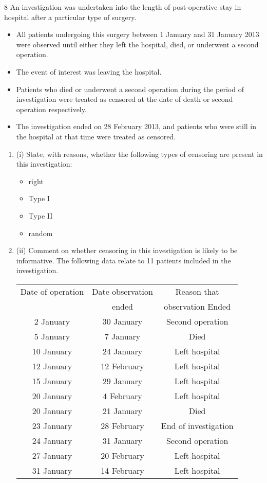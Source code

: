 \documentclass[a4paper,12pt]{article}
\begin{document}
8 An investigation was undertaken into the length of post-operative stay in hospital after
a particular type of surgery. 
\begin{itemize}
    \item All patients undergoing this surgery between 1 January
and 31 January 2013 were observed until either they left the hospital, died, or
underwent a second operation. 
\item The event of interest was leaving the hospital.
\item Patients who died or underwent a second operation during the period of investigation
were treated as censored at the date of death or second operation respectively. 
\item The
investigation ended on 28 February 2013, and patients who were still in the hospital at
that time were treated as censored.
\end{itemize}

\begin{enumerate}
    \item 

(i) State, with reasons, whether the following types of censoring are present in
this investigation:
\begin{itemize}
\item right
\item Type I
\item Type II
\item random
\end{itemize}


\item (ii) Comment on whether censoring in this investigation is likely to be
informative. 
The following data relate to 11 patients included in the investigation.

\begin{center}
\begin{tabular}{c|c|c} \hline
Date of operation & Date observation &  Reason that \\
& ended & observation Ended \\ \hline \hline
2 January &  30 January &  Second operation \\ \hline
5 January &  7 January &  Died \\ \hline
10 January &  24 January &  Left hospital \\ \hline
12 January &  12 February &  Left hospital \\ \hline
15 January &  29 January &  Left hospital \\ \hline
20 January &  4 February &  Left hospital \\ \hline
20 January &  21 January &  Died \\ \hline
23 January &  28 February &  End of investigation  \\ \hline
24 January &  31 January &  Second operation \\ \hline
27 January &  20 February &  Left hospital \\ \hline
31 January &  14 February &  Left hospital \\ \hline
\end{tabular}
\end{center}

\end{enumerate}
\end{document}

